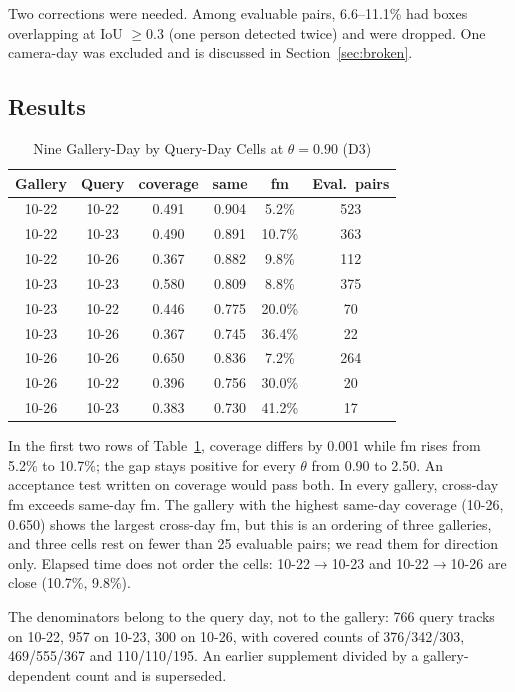 \documentclass[journal]{IEEEtran}
\newcommand{\ra}{$\rightarrow$}
\begin{document}
Two corrections were needed. Among evaluable pairs, 6.6--11.1\% had boxes overlapping at IoU $\ge 0.3$ (one person detected twice) and were dropped. One camera-day was excluded and is discussed in Section~\ref{sec:broken}.

\subsection{Results}
\begin{table}[t]
\caption{Nine Gallery-Day by Query-Day Cells at $\theta = 0.90$ (D3)}\label{tab:xday}
\centering
\setlength{\tabcolsep}{4pt}
\begin{tabular}{@{}cccccc@{}}
\toprule
Gallery & Query & coverage & same & fm & Eval.\ pairs\\
\midrule
10-22 & 10-22 & 0.491 & 0.904 & 5.2\% & 523\\
10-22 & 10-23 & 0.490 & 0.891 & 10.7\% & 363\\
10-22 & 10-26 & 0.367 & 0.882 & 9.8\% & 112\\
10-23 & 10-23 & 0.580 & 0.809 & 8.8\% & 375\\
10-23 & 10-22 & 0.446 & 0.775 & 20.0\% & 70\\
10-23 & 10-26 & 0.367 & 0.745 & 36.4\% & 22\\
10-26 & 10-26 & 0.650 & 0.836 & 7.2\% & 264\\
10-26 & 10-22 & 0.396 & 0.756 & 30.0\% & 20\\
10-26 & 10-23 & 0.383 & 0.730 & 41.2\% & 17\\
\bottomrule
\end{tabular}
\end{table}

In the first two rows of Table~\ref{tab:xday}, coverage differs by 0.001 while fm rises from 5.2\% to 10.7\%; the gap stays positive for every $\theta$ from 0.90 to 2.50. An acceptance test written on coverage would pass both. In every gallery, cross-day fm exceeds same-day fm. The gallery with the highest same-day coverage (10-26, 0.650) shows the largest cross-day fm, but this is an ordering of three galleries, and three cells rest on fewer than 25 evaluable pairs; we read them for direction only. Elapsed time does not order the cells: 10-22\ra10-23 and 10-22\ra10-26 are close (10.7\%, 9.8\%).

The denominators belong to the query day, not to the gallery: 766 query tracks on 10-22, 957 on 10-23, 300 on 10-26, with covered counts of 376/342/303, 469/555/367 and 110/110/195. An earlier supplement divided by a gallery-dependent count and is superseded.
\end{document}
